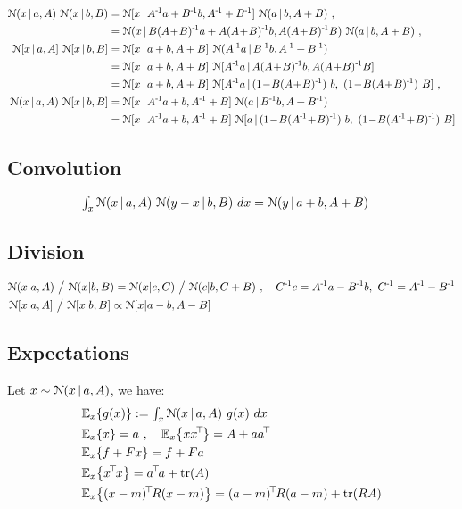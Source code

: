 \begin{align}
\NN(x \| a,A)~ \NN(x \| b,B)
 &= \NN[x \| A^\1 a+B^\1 b, A^\1 + B^\1]~ \NN(a\|b,A+B) ~, \label{prodNat}\\
 &= \NN(x \| B(A\+B)^\1a + A(A\+B)^\1b ,A(A\+B)^\1B)~ \NN(a\|b,A+B) ~,\\
\NN[x \| a,A]~ \NN[x \| b,B]
 &= \NN[x \| a+b,A+B]~ \NN(A^\1 a \| B^\1 b, A^\1+B^\1) \\
 &= \NN[x \| a+b,A+B]~ \NN[ A^\1 a \| A(A\+B)^\1 b, A(A\+B)^\1 B]\\
 &= \NN[x \| a+b,A+B]~ \NN[ A^\1 a \| (1\-B(A\+B)^\1)~ b,~ (1\-B(A\+B)^\1)~ B] ~,\\
\NN(x \| a,A)~ \NN[x \| b,B]
 &= \NN[x \| A^\1 a+ b, A^\1 + B]~ \NN(a\|B^\1 b,A+B^\1) \\
 &= \NN[x \| A^\1 a+ b, A^\1 + B]~ \NN[a\|(1\-B(A^\1\+B)^\1)~ b,~ (1\-B(A^\1\+B)^\1)~
 B] \label{prodNatCan}
\end{align}

\subsection{Convolution}
\begin{align}
\textstyle\int_x {\cal N}(x \,|\,a,A)~ {\cal N}(y-x \,|\, b,B)~ dx
 &= {\cal N}(y \,|\, a+b, A+B)
\end{align}

\subsection{Division}

\begin{align}
{\cal N}(x|&a,A) ~\big/~ {\cal N}(x|b,B) = {\cal N}(x|c,C) ~\big/~ {\cal N}(c| b, C+B) ~,\quad C^{{\hspace*{-.0pt}\text{\rm -}\hspace*{-.5pt}}1}c = A^{{\hspace*{-.0pt}\text{\rm -}\hspace*{-.5pt}}1}a - B^{{\hspace*{-.0pt}\text{\rm -}\hspace*{-.5pt}}1}b,~ C^{{\hspace*{-.0pt}\text{\rm -}\hspace*{-.5pt}}1} = A^{{\hspace*{-.0pt}\text{\rm -}\hspace*{-.5pt}}1} - B^{{\hspace*{-.0pt}\text{\rm -}\hspace*{-.5pt}}1} \\
{\cal N}[x|&a,A] ~\big/~ {\cal N}[x|b,B] \propto {\cal N}[x|a-b,A-B]
\end{align}

\subsection{Expectations}

Let $x\sim{\cal N}(x \,|\, a,A)$, we have:
\begin{align}
&\Exp[x]{g(x)} := \textstyle\int_x \NN(x \| a,A)~ g(x)~ dx \\
&\Exp[x]{x} = a \comma \Exp[x]{x x^\T} = A + a a^\T\\
&\Exp[x]{f+Fx} = f+Fa \\
&\Exp[x]{x^\T x} = a^\T a + \tr(A)\\
&\Exp[x]{(x-m)^\T R(x-m)} = (a-m)^\T R(a-m) + \tr(RA)
\end{align}

